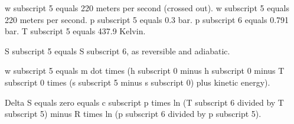 w subscript 5 equals 220 meters per second (crossed out).  
w subscript 5 equals 220 meters per second.  
p subscript 5 equals 0.3 bar.  
p subscript 6 equals 0.791 bar.  
T subscript 5 equals 437.9 Kelvin.  

S subscript 5 equals S subscript 6, as reversible and adiabatic.  

w subscript 5 equals m dot times (h subscript 0 minus h subscript 0 minus T subscript 0 times (s subscript 5 minus s subscript 0) plus kinetic energy).  

Delta S equals zero equals c subscript p times ln (T subscript 6 divided by T subscript 5) minus R times ln (p subscript 6 divided by p subscript 5).
